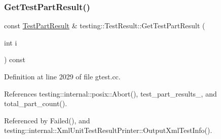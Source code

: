 \mbox{\label{classtesting_1_1TestResult_a765c1e734ac08115757b343d57226bba}} 
\subsubsection{\texorpdfstring{Get\+Test\+Part\+Result()}{GetTestPartResult()}}
{\footnotesize\ttfamily const \hyperlink{classtesting_1_1TestPartResult}{Test\+Part\+Result} \& testing\+::\+Test\+Result\+::\+Get\+Test\+Part\+Result (\begin{DoxyParamCaption}\item[{int}]{i }\end{DoxyParamCaption}) const}



Definition at line 2029 of file gtest.\+cc.



References testing\+::internal\+::posix\+::\+Abort(), test\+\_\+part\+\_\+results\+\_\+, and total\+\_\+part\+\_\+count().



Referenced by Failed(), and testing\+::internal\+::\+Xml\+Unit\+Test\+Result\+Printer\+::\+Output\+Xml\+Test\+Info().


